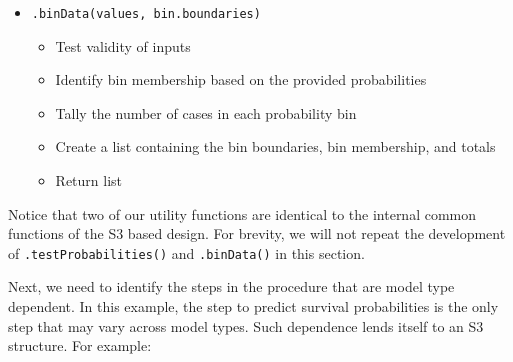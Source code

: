 \documentclass[
]{book}
\providecommand{\tightlist}{%
  \setlength{\itemsep}{0pt}\setlength{\parskip}{0pt}}
\begin{document}
\begin{itemize}
  \begin{itemize}
  \tightlist
  \item
    \texttt{.binData(values,\ bin.boundaries)}

    \begin{itemize}
    \tightlist
    \item
      Test validity of inputs
    \item
      Identify bin membership based on the provided probabilities
    \item
      Tally the number of cases in each probability bin
    \item
      Create a list containing the bin boundaries, bin membership, and totals
    \item
      Return list
    \end{itemize}
  \end{itemize}
\end{itemize}

Notice that two of our utility functions are identical to the internal common functions of the S3 based design. For brevity, we will not repeat the development of \texttt{.testProbabilities()} and \texttt{.binData()} in this section.

Next, we need to identify the steps in the procedure that are model type dependent. In this example, the step to predict survival probabilities is the only step that may vary across model types. Such dependence lends itself to an S3 structure. For example:
\end{document}
